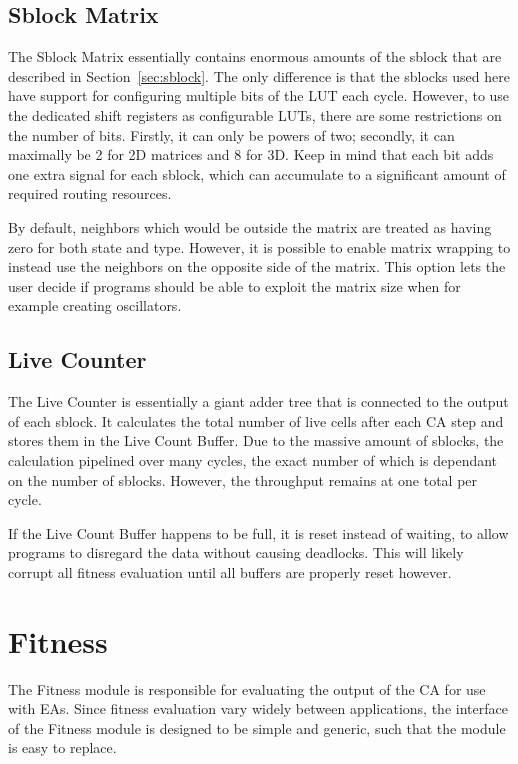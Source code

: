\subsection{Sblock Matrix}

The Sblock Matrix essentially contains enormous amounts of the sblock that are described in Section~\ref{sec:sblock}.
The only difference is that the sblocks used here have support for configuring multiple bits of the LUT each cycle.
However, to use the dedicated shift registers as configurable LUTs, there are some restrictions on the number of bits.
Firstly, it can only be powers of two; secondly, it can maximally be 2 for 2D matrices and 8 for 3D.
Keep in mind that each bit adds one extra signal for each sblock, which can accumulate to a significant amount of required routing resources.

By default, neighbors which would be outside the matrix are treated as having zero for both state and type.
However, it is possible to enable matrix wrapping to instead use the neighbors on the opposite side of the matrix.
This option lets the user decide if programs should be able to exploit the matrix size when for example creating oscillators.

\subsection{Live Counter}

The Live Counter is essentially a giant adder tree that is connected to the output of each sblock.
It calculates the total number of live cells after each CA step and stores them in the Live Count Buffer.
Due to the massive amount of sblocks, the calculation pipelined over many cycles, the exact number of which is dependant on the number of sblocks.
However, the throughput remains at one total per cycle.

If the Live Count Buffer happens to be full, it is reset instead of waiting, to allow programs to disregard the data without causing deadlocks.
This will likely corrupt all fitness evaluation until all buffers are properly reset however.


\section{Fitness}
\label{sec:fitness}

The Fitness module is responsible for evaluating the output of the CA for use with EAs.
Since fitness evaluation vary widely between applications, the interface of the Fitness module is designed to be simple and generic, such that the module is easy to replace.

